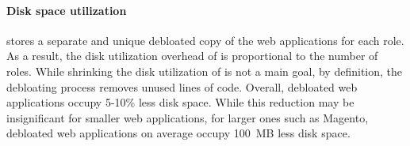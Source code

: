 \paragraph{Disk space utilization} \sys{} stores a separate and unique debloated copy of the web applications for each role. 
As a result, the disk utilization overhead of \sys{} is proportional to the number of roles. 
While shrinking the disk utilization of \sys{} is not a main goal, by definition, the debloating process removes unused lines of code. 
Overall, debloated web applications occupy 5-10\% less disk space. 
While this reduction may be insignificant for smaller web applications, for larger ones such as Magento, debloated web applications on average occupy 100~MB less disk space. 


\begin{table}[]
    \centering
    \caption{Average CPU and Memory utilization of \sys. \textit{DBLTR N}-Web Servers row shows the range of CPU and Memory utilization for \textit{DBLTR 1} to \textit{DBLTR 50}.}
    \label{tab:performance}
\end{table}
